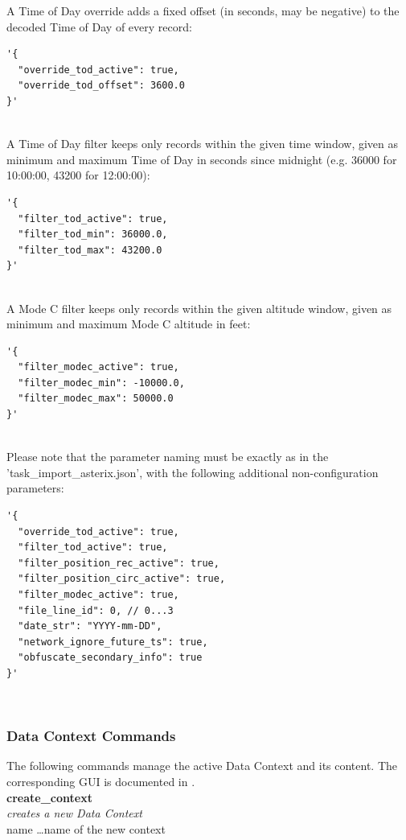 A Time of Day override adds a fixed offset (in seconds, may be negative) to the decoded Time of Day of every record:
\begin{lstlisting}[basicstyle=\small\ttfamily]
'{
  "override_tod_active": true,
  "override_tod_offset": 3600.0
}'
\end{lstlisting}
\ \\

A Time of Day filter keeps only records within the given time window, given as minimum and maximum Time of Day in seconds since midnight (e.g. 36000 for 10:00:00, 43200 for 12:00:00):
\begin{lstlisting}[basicstyle=\small\ttfamily]
'{
  "filter_tod_active": true,
  "filter_tod_min": 36000.0,
  "filter_tod_max": 43200.0
}'
\end{lstlisting}
\ \\

A Mode C filter keeps only records within the given altitude window, given as minimum and maximum Mode C altitude in feet:
\begin{lstlisting}[basicstyle=\small\ttfamily]
'{
  "filter_modec_active": true,
  "filter_modec_min": -10000.0,
  "filter_modec_max": 50000.0
}'
\end{lstlisting}
\ \\

Please note that the parameter naming must be exactly as in the 'task\_import\_asterix.json', with the following additional non-configuration parameters:
\begin{lstlisting}[basicstyle=\small\ttfamily]
'{
  "override_tod_active": true,
  "filter_tod_active": true,
  "filter_position_rec_active": true,
  "filter_position_circ_active": true,
  "filter_modec_active": true,
  "file_line_id": 0, // 0...3
  "date_str": "YYYY-mm-DD",
  "network_ignore_future_ts": true,
  "obfuscate_secondary_info": true
}'
\end{lstlisting}
\ \\

\subsubsection{Data Context Commands}

The following commands manage the active Data Context and its content. The corresponding GUI is documented in . \\

\textbf{create\_context} \\
\textit{creates a new Data Context} \\
name \dots name of the new context \\

